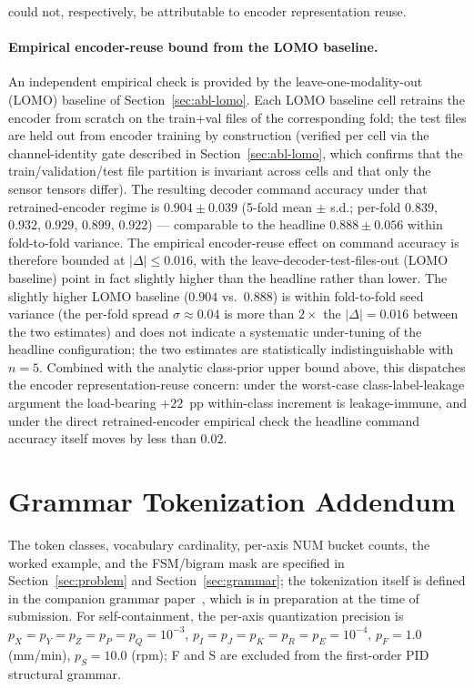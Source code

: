 \documentclass[sensors,article,submit,moreauthors,pdftex]{Definitions/mdpi}
\begin{document}
could not, respectively, be attributable to encoder representation reuse.

\paragraph{Empirical encoder-reuse bound from the LOMO baseline.} An independent empirical check is provided by the leave-one-modality-out (LOMO) baseline of Section~\ref{sec:abl-lomo}. Each LOMO baseline cell retrains the encoder from scratch on the train+val files of the corresponding fold; the test files are held out from encoder training by construction (verified per cell via the channel-identity gate described in Section~\ref{sec:abl-lomo}, which confirms that the train/validation/test file partition is invariant across cells and that only the sensor tensors differ). The resulting decoder command accuracy under that retrained-encoder regime is $0.904 \pm 0.039$ (5-fold mean $\pm$ s.d.; per-fold $0.839$, $0.932$, $0.929$, $0.899$, $0.922$) --- comparable to the headline $0.888 \pm 0.056$ within fold-to-fold variance. The empirical encoder-reuse effect on command accuracy is therefore bounded at $|\Delta|\!\le\!0.016$, with the leave-decoder-test-files-out (LOMO baseline) point in fact slightly higher than the headline rather than lower. The slightly higher LOMO baseline ($0.904$ vs.\ $0.888$) is within fold-to-fold seed variance (the per-fold spread $\sigma\!\approx\!0.04$ is more than $2\times$ the $|\Delta|\!=\!0.016$ between the two estimates) and does not indicate a systematic under-tuning of the headline configuration; the two estimates are statistically indistinguishable with $n\!=\!5$. Combined with the analytic class-prior upper bound above, this dispatches the encoder representation-reuse concern: under the worst-case class-label-leakage argument the load-bearing $+22$~pp within-class increment is leakage-immune, and under the direct retrained-encoder empirical check the headline command accuracy itself moves by less than $0.02$.

\section{Grammar Tokenization Addendum}
\label{app:grammar-spec}

The token classes, vocabulary cardinality, per-axis NUM bucket counts, the worked example, and the FSM/bigram mask are specified in Section~\ref{sec:problem} and Section~\ref{sec:grammar}; the tokenization itself is defined in the companion grammar paper~\cite{grammar_paper}, which is in preparation at the time of submission. For self-containment, the per-axis quantization precision is $p_X\!=\!p_Y\!=\!p_Z\!=\!p_P\!=\!p_Q\!=\!10^{-3}$, $p_I\!=\!p_J\!=\!p_K\!=\!p_R\!=\!p_E\!=\!10^{-4}$, $p_F\!=\!1.0$ (mm/min), $p_S\!=\!10.0$ (rpm); F and S are excluded from the first-order PID structural grammar.
\end{document}

